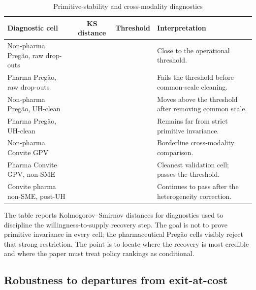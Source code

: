\documentclass[12pt]{article}
\begin{document}
\begin{table}[!htbp]
\centering
\begin{threeparttable}
\caption{Primitive-stability and cross-modality diagnostics}
\label{tab:app_ks}
\scriptsize
\setlength{\tabcolsep}{3pt}
\begin{tabular}{>{\raggedright\arraybackslash}p{}cc>{\raggedright\arraybackslash}p{}}
\toprule
Diagnostic cell & KS distance & Threshold & Interpretation \\
\midrule
Non-pharma Preg\~ao, raw drop-outs & \ksNpPregao{} & \ksDistThresh{} & Close to the operational threshold. \\
Pharma Preg\~ao, raw drop-outs & \ksPharmaPregao{} & \ksDistThresh{} & Fails the threshold before common-scale cleaning. \\
Non-pharma Preg\~ao, UH-clean & \ksNpPregaoUH{} & \ksDistThresh{} & Moves above the threshold after removing common scale. \\
Pharma Preg\~ao, UH-clean & \ksPharmaPregaoUH{} & \ksDistThresh{} & Remains far from strict primitive invariance. \\
Non-pharma Convite GPV & \ksNpConvite{} & \ksDistThresh{} & Borderline cross-modality comparison. \\
Pharma Convite GPV, non-SME & \ksConvitePharmaNS{} & \ksDistThresh{} & Cleanest validation cell; passes the threshold. \\
Convite pharma non-SME, post-UH & \ksUHinvCheckLo{} & \ksDistThresh{} & Continues to pass after the heterogeneity correction. \\
\bottomrule
\end{tabular}
\begin{tablenotes}\footnotesize
\item The table reports Kolmogorov--Smirnov distances for diagnostics used to
discipline the willingness-to-supply recovery step. The goal is not to prove primitive
invariance in every cell; the pharmaceutical Preg\~ao cells visibly reject that
strong restriction. The point is to locate where the recovery is most credible
and where the paper must treat policy rankings as conditional.
\end{tablenotes}
\end{threeparttable}
\end{table}

\subsection{Robustness to departures from exit-at-cost}\label{oa:ipv_slack}
\end{document}
